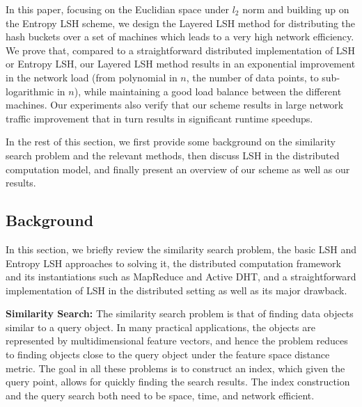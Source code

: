 \documentclass{acm_proc_article-sp}
\numberwithin{equation}{section}
\numberwithin{figure}{section}
\begin{document}
In this paper, focusing on the Euclidian space under $l_2$ norm and building up on the Entropy LSH scheme, we design the Layered LSH method for distributing the hash buckets over a set of machines which leads to a very high network efficiency. We prove that, compared to a straightforward distributed implementation of LSH or Entropy LSH, our Layered LSH method results in an exponential improvement in the network load (from polynomial in $n$, the number of data points, to sub-logarithmic in $n$), while maintaining a good load balance between the different machines. Our experiments also verify that our scheme results in large network traffic improvement that in turn results in significant runtime speedups. 

In the rest of this section, we first provide some background on the similarity search problem and the relevant methods, then discuss LSH in the distributed computation model, and finally present an overview of our scheme as well as our results.


\subsection{Background}
\label{sec:bckgrnd}

In this section, we briefly review the similarity search problem, the basic LSH and Entropy LSH approaches to solving it, the distributed computation framework and its instantiations such as MapReduce and Active DHT, and a straightforward implementation of LSH in the distributed setting as well as its major drawback.

\noindent \textbf{Similarity Search:} The similarity search problem is that of finding data objects similar to a query object. In many practical applications, the objects are represented by multidimensional feature vectors, and hence the problem reduces to finding objects close to the query object under the feature space distance metric. The goal in all these problems is to construct an index, which given the query point, allows for quickly finding the search results. The index construction and the query search both need to be space, time, and network efficient.
\end{document}
